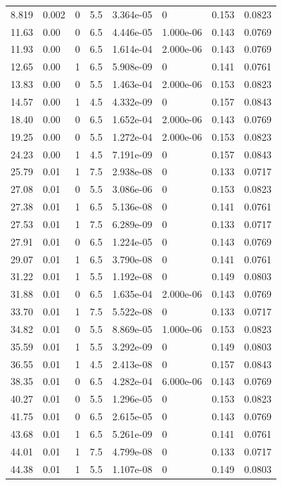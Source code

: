 \documentclass[preview]{standalone}
\begin{document}
{{\begin{tabular}{L{1.2cm}C{1.2cm} C{0.3cm}C{0.5cm} C{1.4cm}C{1.4cm} C{1.4cm}C{1.4cm}}
  8.819  &  0.002  & 0     & 5.5 &  3.364e-05  & 0  & 0.153 &  0.0823   \\ 
  11.63  &  0.00  & 0     & 6.5 &  4.446e-05  & 1.000e-06  & 0.143 &  0.0769   \\ 
  11.93  &  0.00  & 0     & 6.5 &  1.614e-04  & 2.000e-06  & 0.143 &  0.0769   \\ 
  12.65  &  0.00  & 1     & 6.5 &  5.908e-09  & 0  & 0.141 &  0.0761   \\ 
  13.83  &  0.00  & 0     & 5.5 &  1.463e-04  & 2.000e-06  & 0.153 &  0.0823   \\ 
  14.57  &  0.00  & 1     & 4.5 &  4.332e-09  & 0  & 0.157 &  0.0843   \\ 
  18.40  &  0.00  & 0     & 6.5 &  1.652e-04  & 2.000e-06  & 0.143 &  0.0769   \\ 
  19.25  &  0.00  & 0     & 5.5 &  1.272e-04  & 2.000e-06  & 0.153 &  0.0823   \\ 
  24.23  &  0.00  & 1     & 4.5 &  7.191e-09  & 0  & 0.157 &  0.0843   \\ 
  25.79  &  0.01  & 1     & 7.5 &  2.938e-08  & 0  & 0.133 &  0.0717   \\ 
  27.08  &  0.01  & 0     & 5.5 &  3.086e-06  & 0  & 0.153 &  0.0823   \\ 
  27.38  &  0.01  & 1     & 6.5 &  5.136e-08  & 0  & 0.141 &  0.0761   \\ 
  27.53  &  0.01  & 1     & 7.5 &  6.289e-09  & 0  & 0.133 &  0.0717   \\ 
  27.91  &  0.01  & 0     & 6.5 &  1.224e-05  & 0  & 0.143 &  0.0769   \\ 
  29.07  &  0.01  & 1     & 6.5 &  3.790e-08  & 0  & 0.141 &  0.0761   \\ 
  31.22  &  0.01  & 1     & 5.5 &  1.192e-08  & 0  & 0.149 &  0.0803   \\ 
  31.88  &  0.01  & 0     & 6.5 &  1.635e-04  & 2.000e-06  & 0.143 &  0.0769   \\ 
  33.70  &  0.01  & 1     & 7.5 &  5.522e-08  & 0  & 0.133 &  0.0717   \\ 
  34.82  &  0.01  & 0     & 5.5 &  8.869e-05  & 1.000e-06  & 0.153 &  0.0823   \\ 
  35.59  &  0.01  & 1     & 5.5 &  3.292e-09  & 0  & 0.149 &  0.0803   \\ 
  36.55  &  0.01  & 1     & 4.5 &  2.413e-08  & 0  & 0.157 &  0.0843   \\ 
  38.35  &  0.01  & 0     & 6.5 &  4.282e-04  & 6.000e-06  & 0.143 &  0.0769   \\ 
  40.27  &  0.01  & 0     & 5.5 &  1.296e-05  & 0  & 0.153 &  0.0823   \\ 
  41.75  &  0.01  & 0     & 6.5 &  2.615e-05  & 0  & 0.143 &  0.0769   \\ 
  43.68  &  0.01  & 1     & 6.5 &  5.261e-09  & 0  & 0.141 &  0.0761   \\ 
  44.01  &  0.01  & 1     & 7.5 &  4.799e-08  & 0  & 0.133 &  0.0717   \\ 
  44.38  &  0.01  & 1     & 5.5 &  1.107e-08  & 0  & 0.149 &  0.0803   \\ 
\hline 
\end{tabular} 

}}
\end{document}
